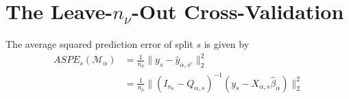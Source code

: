 \documentclass[Research_Module_ES.tex]{subfiles}
\begin{document}
\section{The Leave-$n_\nu$-Out Cross-Validation}

\begin{lemma}
	\label{Equation3.1}
	The average squared prediction error of split $s$ is given by
	\begin{align*}
		ASPE_{s}(\mathcal{M}_\alpha)&=\frac{1}{n_\nu}\parallel y_s-\hat{y}_{\alpha,s^c}\parallel_2^2\\
		&=\frac{1}{n_\nu}\parallel (I_{n_\nu}-Q_{\alpha,s})^{-1}(y_s-X_{\alpha,s}\hat{\beta}_\alpha)\parallel_2^2
	\end{align*}
\end{lemma}
\end{document}
